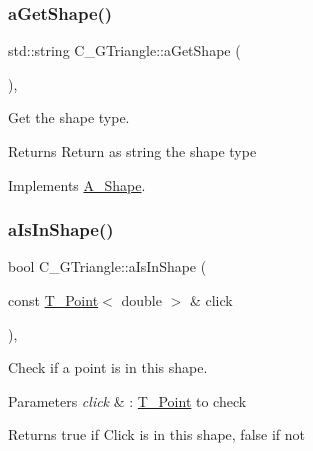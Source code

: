 \subsubsection{\texorpdfstring{a\+Get\+Shape()}{aGetShape()}\hspace{0.1cm}{\footnotesize\ttfamily [2/2]}}
{\footnotesize\ttfamily std\+::string C\+\_\+\+G\+Triangle\+::a\+Get\+Shape (\begin{DoxyParamCaption}{ }\end{DoxyParamCaption})\hspace{0.3cm}{\ttfamily [override]}, {\ttfamily [virtual]}}



Get the shape type. 

\begin{DoxyReturn}{Returns}
Return as string the shape type 
\end{DoxyReturn}


Implements \hyperlink{classA__Shape_a1b202256a4e5dcb0edab4ab93a37122c}{A\+\_\+\+Shape}.

\mbox{\label{classC__GTriangle_a417b28c74dd35f81a19b5bd1d214ba8d}} 
\subsubsection{\texorpdfstring{a\+Is\+In\+Shape()}{aIsInShape()}\hspace{0.1cm}{\footnotesize\ttfamily [1/2]}}
{\footnotesize\ttfamily bool C\+\_\+\+G\+Triangle\+::a\+Is\+In\+Shape (\begin{DoxyParamCaption}\item[{const \hyperlink{classT__Point}{T\+\_\+\+Point}$<$ double $>$ \&}]{click }\end{DoxyParamCaption})\hspace{0.3cm}{\ttfamily [override]}, {\ttfamily [virtual]}}



Check if a point is in this shape. 


\begin{DoxyParams}{Parameters}
{\em click} & \+: \hyperlink{classT__Point}{T\+\_\+\+Point} to check \\
\hline
\end{DoxyParams}
\begin{DoxyReturn}{Returns}
true if Click is in this shape, false if not 
\end{DoxyReturn}


